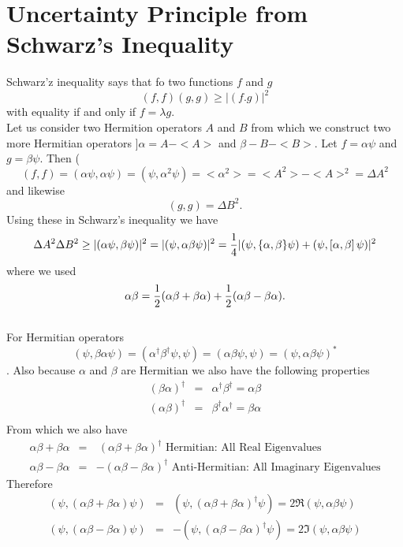 \section{Uncertainty Principle from Schwarz's Inequality}

   Schwarz'z inequality says that fo two functions $f$ and $g$ 
   \[ (f,f) (g,g) \ge |(f.g)|^2\] with equality if and only if $f=\lambda g$. \\
   
   Let us consider two Hermition operators $A$ and $B$ from which we construct two more Hermitian operators $]\alpha = A - <A>$ and $\beta - B - <B>$. Let $f = \alpha \psi$ and $g = \beta \psi$. Then
   (\[ (f,f) = (\alpha \psi, \alpha \psi) = (\psi, \alpha^2 \psi) = <\alpha^2> = <A^2> - <A>^2 = \Delta A^2\] and likewise \[(g,g) = \Delta B^2.\] Using these in Schwarz's inequality we have
   $$ \Delta A^2 \Delta B^2 \ge | (\alpha \psi, \beta \psi)|^2 = |(\psi,\alpha\beta \psi)|^2 = {1\over 4}|(\psi,\{ \alpha, \beta\}\psi) + (\psi, \left[ \alpha,\beta\right]\psi)|^2$$  where we used 
   $$\alpha\beta = {1\over2}(\alpha\beta + \beta\alpha) + {1\over2} (\alpha\beta - \beta\alpha).$$\\
   For Hermitian operators $$(\psi,\beta \alpha \psi) = (\alpha^\dagger\beta^\dagger\psi, \psi) = (\alpha \beta \psi, \psi) = (\psi, \alpha \beta \psi )^*$$. Also because $\alpha$ and $\beta$ are Hermitian we also have the following 
   properties 
   \begin{eqnarray*}
   (\beta\alpha)^\dagger &=& \alpha^\dagger\beta^\dagger = \alpha\beta\\
   (\alpha\beta)^\dagger &=& \beta^\dagger\alpha^\dagger = \beta\alpha\\
   \end{eqnarray*}From which we also have
   \begin{eqnarray*}
   \alpha\beta + \beta\alpha &=& ~(\alpha\beta + \beta\alpha)^\dagger \mbox{ Hermitian: All Real Eigenvalues}\\ 
   \alpha\beta - \beta\alpha &=&   -(\alpha\beta - \beta\alpha)^\dagger \mbox{ Anti-Hermitian: All Imaginary Eigenvalues}
   \end{eqnarray*}Therefore
    \begin{eqnarray*}
   (\psi,(\alpha\beta + \beta\alpha)\psi) &=& (\psi,(\alpha\beta + \beta\alpha)^\dagger\psi)  = 2\Re(\psi,\alpha\beta\psi)\\ 
   (\psi,(\alpha\beta - \beta\alpha)\psi) &=& -(\psi,(\alpha\beta - \beta\alpha)^\dagger\psi)  = 2\Im(\psi,\alpha\beta\psi)
   \end{eqnarray*} 
